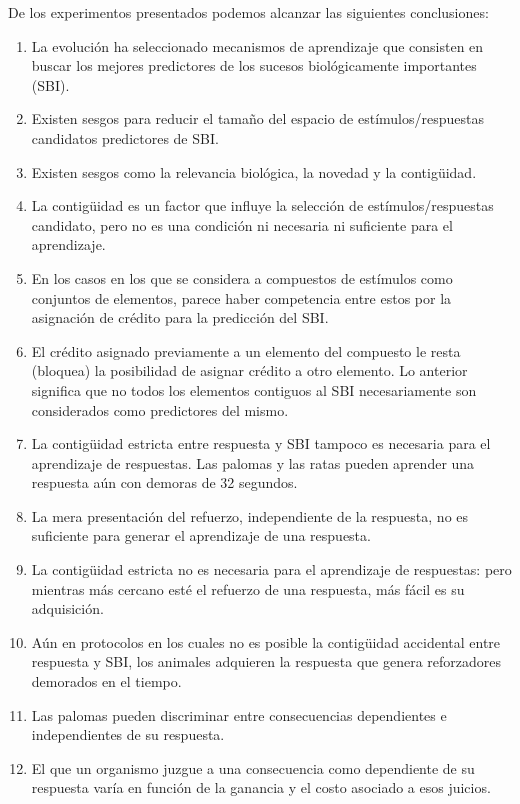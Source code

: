 \documentclass[
  a4paper,
  DIV=11,
  numbers=noendperiod]{scrreprt}
\begin{document}
De los experimentos presentados podemos alcanzar las siguientes
conclusiones:

\begin{enumerate}
\def\labelenumi{\arabic{enumi}.}
\item
  La evolución ha seleccionado mecanismos de aprendizaje que consisten
  en buscar los mejores predictores de los sucesos biológicamente
  importantes (SBI).
\item
  Existen sesgos para reducir el tamaño del espacio de
  estímulos/respuestas candidatos predictores de SBI.
\item
  Existen sesgos como la relevancia biológica, la novedad y la
  contigüidad.
\item
  La contigüidad es un factor que influye la selección de
  estímulos/respuestas candidato, pero no es una condición ni necesaria
  ni suficiente para el aprendizaje.
\item
  En los casos en los que se considera a compuestos de estímulos como
  conjuntos de elementos, parece haber competencia entre estos por la
  asignación de crédito para la predicción del SBI.
\item
  El crédito asignado previamente a un elemento del compuesto le resta
  (bloquea) la posibilidad de asignar crédito a otro elemento. Lo
  anterior significa que no todos los elementos contiguos al SBI
  necesariamente son considerados como predictores del mismo.
\item
  La contigüidad estricta entre respuesta y SBI tampoco es necesaria
  para el aprendizaje de respuestas. Las palomas y las ratas pueden
  aprender una respuesta aún con demoras de 32 segundos.
\item
  La mera presentación del refuerzo, independiente de la respuesta, no
  es suficiente para generar el aprendizaje de una respuesta.
\item
  La contigüidad estricta no es necesaria para el aprendizaje de
  respuestas: pero mientras más cercano esté el refuerzo de una
  respuesta, más fácil es su adquisición.
\item
  Aún en protocolos en los cuales no es posible la contigüidad
  accidental entre respuesta y SBI, los animales adquieren la respuesta
  que genera reforzadores demorados en el tiempo.
\item
  Las palomas pueden discriminar entre consecuencias dependientes e
  independientes de su respuesta.
\item
  El que un organismo juzgue a una consecuencia como dependiente de su
  respuesta varía en función de la ganancia y el costo asociado a esos
  juicios.
\end{enumerate}
\end{document}

